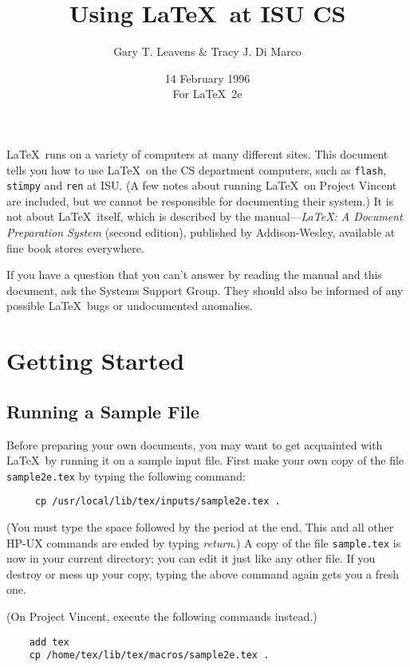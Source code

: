 \documentclass{article}
\title{Using \LaTeX\ at ISU CS}
\author{Gary T. Leavens \& Tracy J. Di Marco}
\date{14 February 1996\\              %
For \LaTeX\ 2e}
\newcommand{\contact}{the Systems Support Group}
\begin{document}
\maketitle

\tableofcontents

\newpage

\LaTeX\ runs on a variety of computers at many different sites.  This
document tells you how to use \LaTeX\ on the CS department
computers, such as {\tt flash}, {\tt stimpy} and {\tt ren} at ISU.
(A few notes about running \LaTeX\ on Project Vincent are included,
but we cannot be responsible for documenting their system.)
It is not about \LaTeX\ itself, which is described by
the manual---{\em \LaTeX: A Document Preparation System\/} (second edition),
published by Addison-Wesley, available at fine book stores everywhere.

If you have a question that you can't answer by reading the manual and
this document, ask \contact.  They should also be informed of any
possible \LaTeX\ bugs or undocumented anomalies.


\section{Getting Started}

\subsection{Running a Sample File} \label{sec:sample}

Before preparing your own documents, you may want to get acquainted
with \LaTeX\ by running it on a sample input file.  First make your own
copy of the file \mbox{\tt sample2e.tex} by typing the following
command:
\begin{verbatim}
     cp /usr/local/lib/tex/inputs/sample2e.tex .
\end{verbatim}
(You must type the space followed by the period at the end.  This
and all other HP-UX commands are ended by typing {\em return}.)
A copy of the file \mbox{\tt sample.tex} is now in your current
directory; you can edit it just like any other file.  If you destroy or
mess up your copy, typing the above command again gets you a fresh
one.

(On Project Vincent, execute the following commands instead.)
\begin{verbatim}
    add tex
    cp /home/tex/lib/tex/macros/sample2e.tex .
\end{verbatim}
\end{document}
